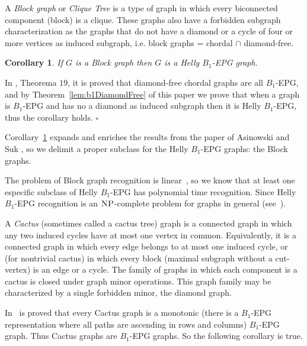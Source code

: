 \documentclass[9pt]{entcs}
\newtheorem{coro}{Corollary}[section]
\begin{document}
A \textit{Block graph} or \textit{Clique Tree} is a type of graph in which every biconnected component (block) is a clique. These graphs also have a forbidden subgraph characterization as the graphs that do not have a diamond or a cycle of four or more vertices as induced subgraph, i.e. block graphs = chordal $\cap$ diamond-free.


\begin{coro}\label{lem:cdf}
If $G$ is a Block graph then $G$ is a Helly $B_1$-EPG graph.
\end{coro}

\begin{pf}
In \cite{ries2009}, Theorema $19$, it is proved that diamond-free chordal graphs are all $B_1$-EPG, and by Theorem~\ref{lem:b1DiamondFree} of this paper we prove that when a graph is $B_1$-EPG and has no a diamond as induced subgraph then it is Helly $B_1$-EPG, thus the corollary holds.
 $\square$\end{pf} 

Corollary~\ref{lem:cdf} expands and enriches the results from the paper of Asinowski and Suk \cite{ries2009}, so we delimit a proper subclass for the Helly $B_1$-EPG graphs: the Block graphs.


The problem of Block graph recognition is linear~\cite{tarjan1972depth}, so we know that at least one especific subclass of Helly $B_1$-EPG has polynomial time recognition. Since Helly $B_1$-EPG recognition is an $\textsc{NP}$-complete problem for graphs in general (see~\cite{bornstein2019complexity}).


A \textit{Cactus} (sometimes called a cactus tree)  graph is a connected graph in which any two induced cycles have at most one vertex in common. Equivalently, it is a connected graph in which every edge belongs to at most one induced cycle, or (for nontrivial cactus) in which every block (maximal subgraph without a cut-vertex) is an edge or a cycle. The family of graphs in which each component is a cactus is closed under graph minor operations. This graph family may be characterized by a single forbidden minor, the diamond graph.
 
 In~\cite{cela2019monotonic} is proved that every Cactus graph is a monotonic (there is a $B_1$-EPG representation where all paths are ascending in rows and columns) $B_1$-EPG graph. Thus Cactus graphs are $B_1$-EPG graphs. So the following corollary is true. 
 
\end{document}
